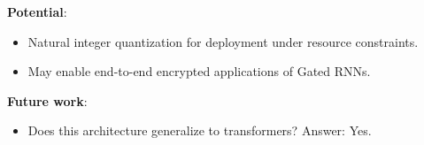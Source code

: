 \documentclass[12pt,oneside]{book}
\begin{document}
\begin{framed}
\noindent
\textbf{Potential}: 
\begin{itemize}
    \item Natural integer quantization for deployment under resource constraints.
    \item May enable end-to-end encrypted applications of Gated RNNs.
\end{itemize}

\noindent
\textbf{Future work}: 
\begin{itemize}
    \item Does this architecture generalize to transformers? Answer: Yes.
\end{itemize}

\end{framed}
 
\end{document}
